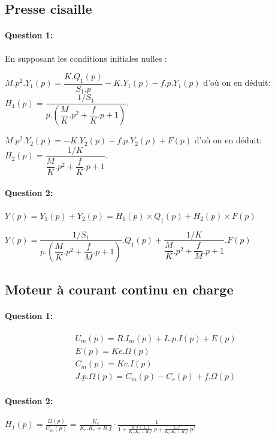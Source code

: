 \subsection{Presse cisaille}

\paragraph{Question 1:}

En supposant les conditions initiales nulles :

$M.p^2.Y_1(p)=\dfrac{K.Q_1(p)}{S_1.p}-K.Y_1(p)-f.p.Y_1(p)$ d'où on en déduit: $H_1(p)=\dfrac{1/S_1}{p.\left(\dfrac{M}{K}.p^2+\dfrac{f}{K}.p+1\right)}$.

$M.p^2.Y_2(p)=-K.Y_2(p)-f.p.Y_2(p)+F(p)$ d'où on en déduit: $H_2(p)=\dfrac{1/K}{\dfrac{M}{K}.p^2+\dfrac{f}{K}.p+1}$.

\paragraph{Question 2:}

$Y(p)=Y_1(p)+Y_2(p)=H_1(p)\times Q_1(p)+H_2(p)\times F(p)$

$Y(p)=\dfrac{1/S_1}{p.\left(\dfrac{M}{K}.p^2+\dfrac{f}{M}.p+1\right)}.Q_1(p)+
\dfrac{1/K}{\dfrac{M}{K}.p^2+\dfrac{f}{M}.p+1}.F(p)$

\subsection{Moteur à courant continu en charge}

\paragraph{Question 1:} 

\begin{eqnarray}
U_m(p)=R.I_m(p)+L.p.I(p)+E(p) \\
E(p)=Ke.\Omega(p) \\
C_m(p)=Kc.I(p) \\
J.p.\Omega(p)=C_m(p)-C_r(p)+f.\Omega(p)
\end{eqnarray}

\paragraph{Question 2:} $H_1(p)=\frac{{\Omega}(p)}{{U}_{m}(p)}=\frac{K_c}{K_e.K_c+R.f} \cdot \frac{1}{1+\frac{R.J+L.f}{K_e.K_c+R.f}.p+\frac{L.J}{K_e.K_c+R.f}.p^2}$

